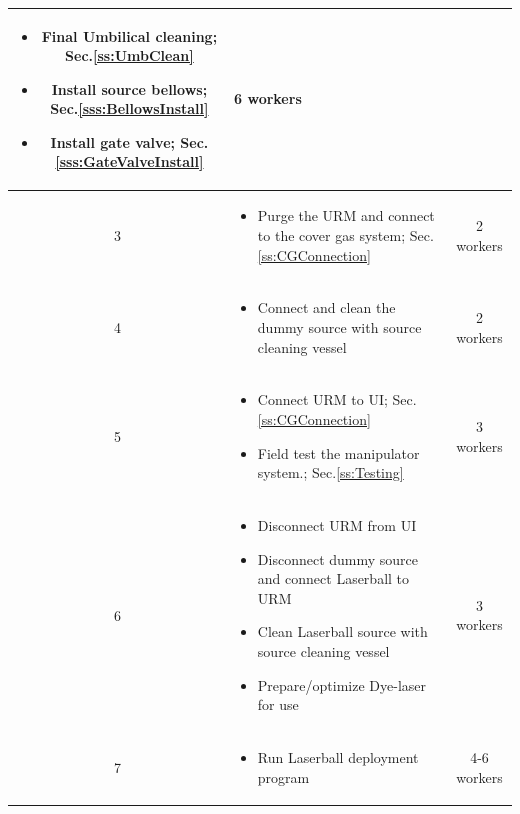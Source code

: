 \documentclass[11pt]{article}
\begin{document}
\begin{table}
\begin{tabular}{|c|p{13cm}|c|}
\begin{itemize}[label={$\square$}]
    \item Final Umbilical cleaning; Sec.\ref{ss:UmbClean}
    \item Install source bellows; Sec.\ref{sss:BellowsInstall}
    \item Install gate valve; Sec.\ref{sss:GateValveInstall}
    \end{itemize} \vspace{-0.5cm} 
    & 6 workers \\ \hline
    3 & \vspace{-0.7cm} \begin{itemize}[label={$\square$}]
    \item Purge the URM and connect to the cover gas system; Sec.\ref{ss:CGConnection}
    \end{itemize} \vspace{-0.5cm} 
    & 2 workers \\\hline
    4 & \vspace{-0.7cm} \begin{itemize}[label={$\square$}]
    \item Connect and clean the dummy source with source cleaning vessel
    \end{itemize} \vspace{-0.5cm} 
    & 2 workers \\\hline
    5 &  \vspace{-0.7cm} \begin{itemize}[label={$\square$}]
    \item Connect URM to UI; Sec.\ref{ss:CGConnection}
    \item Field test the manipulator system.; Sec.\ref{ss:Testing}
    \end{itemize} \vspace{-0.5cm} 
    & 3 workers \\
    6 & \vspace{-0.7cm} \begin{itemize}[label={$\square$}]
    \item Disconnect URM from UI
    \item Disconnect dummy source and connect Laserball to URM
    \item Clean Laserball source with source cleaning vessel
    \item Prepare/optimize Dye-laser for use
    \end{itemize} \vspace{-0.5cm} 
    & 3 workers \\ \hline
    7 & \vspace{-0.7cm} \begin{itemize}[label={$\square$}]
    \item Run Laserball deployment program
    \end{itemize} \vspace{-0.5cm} 
    & 4-6 workers \\\hline
  \end{tabular}
  \label{tab:blockSchedule}
\end{table}
\end{document}
